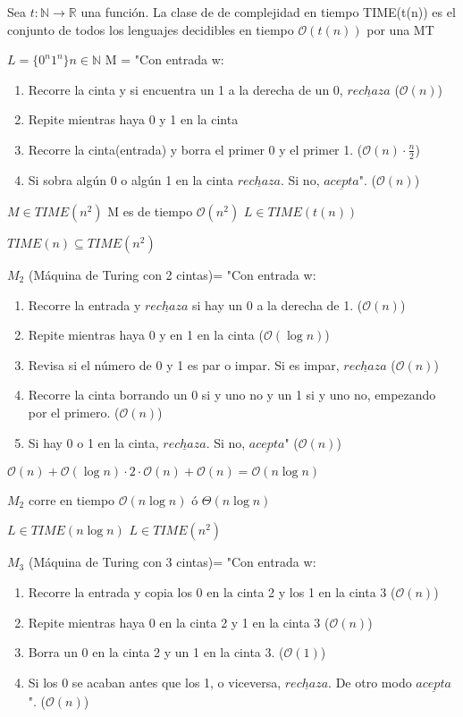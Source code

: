 \documentclass{homework}
\begin{document}
Sea $t: \mathds{N} \rightarrow \mathds{R}$ una función. La clase de de complejidad en tiempo TIME(t(n)) es el conjunto de todos los lenguajes decidibles en tiempo $\mathcal{O}(t(n))$ por una MT

$L = \{0^{n}1^{n}\} n \in \mathds{N}$
M = "Con entrada w:
\begin{enumerate}
	\item Recorre la cinta y si encuentra un 1 a la derecha de un 0, $\underline{rechaza}$ ($\mathcal{O}(n)$)
	\item Repite mientras haya 0 y 1 en la cinta 
	\item Recorre la cinta(entrada) y borra el primer 0 y el primer 1. ($\mathcal{O}(n) \cdot \frac{n}{2}$) 
	\item Si sobra algún 0 o algún 1 en la cinta $\underline{rechaza}$. Si no, $\underline{acepta}$". ($\mathcal{O}(n)$)
\end{enumerate}

$M \in TIME(n^2)$ M es de tiempo $\mathcal{O}(n^{2})$
$L \in TIME(t(n))$

$TIME(n) \subseteq TIME(n^2)$


$M_2$ (Máquina de Turing con 2 cintas)= "Con entrada w:
\begin{enumerate}
	\item Recorre la entrada y $\underline{rechaza}$ si hay un 0 a la derecha de 1. ($\mathcal{O}(n)$)
	\item Repite mientras haya 0 y en 1 en la cinta ($\mathcal{O}(\log{n})$)
	\item Revisa si el número de 0 y 1 es par o impar. Si es impar, $\underline{rechaza}$ ($\mathcal{O}(n)$)
	\item Recorre la cinta borrando un 0 si y uno no y un 1 si y uno no, empezando por el primero. ($\mathcal{O}(n)$)
	\item Si hay 0 o 1 en la cinta, $\underline{rechaza}$. Si no, $\underline{acepta}$" ($\mathcal{O}(n)$)
\end{enumerate}

$\mathcal{O}(n) + \mathcal{O}(\log{n}) \cdot 2\cdot \mathcal{O}(n)  + \mathcal{O}(n) = \mathcal{O}(n \log{n})$

$M_2$ corre en tiempo $\mathcal{O}(n \log{n})$ ó $\Theta(n \log{n})$

$L \in TIME(n\log{n})$
$L \in TIME(n^2)$


$M_3$ (Máquina de Turing con 3 cintas)= "Con entrada w:
\begin{enumerate}
	\item Recorre la entrada y copia los 0 en la cinta 2 y los 1 en la cinta 3 ($\mathcal{O}(n)$)
	\item Repite mientras haya 0 en la cinta 2 y 1 en la cinta 3 ($\mathcal{O}(n)$)
	\item Borra un 0 en la cinta 2 y un 1 en la cinta 3. ($\mathcal{O}(1)$)
	\item Si los 0 se acaban antes que los 1, o viceversa, $\underline{rechaza}$. De otro modo $\underline{acepta}$". ($\mathcal{O}(n)$)
\end{enumerate}
\end{document}
